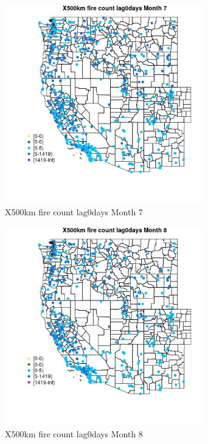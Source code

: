 \begin{figure} 
\centering  
\includegraphics[width=0.77\textwidth]{Code_Outputs/Report_ML_input_PM25_Step4_part_e_de_duplicated_aves_compiled_2019-05-14wNAs_MapObsMo7X500km_fire_count_lag0days.jpg} 
\caption{\label{fig:Report_ML_input_PM25_Step4_part_e_de_duplicated_aves_compiled_2019-05-14wNAsMapObsMo7X500km_fire_count_lag0days}X500km fire count lag0days Month 7} 
\end{figure} 
 

\begin{figure} 
\centering  
\includegraphics[width=0.77\textwidth]{Code_Outputs/Report_ML_input_PM25_Step4_part_e_de_duplicated_aves_compiled_2019-05-14wNAs_MapObsMo8X500km_fire_count_lag0days.jpg} 
\caption{\label{fig:Report_ML_input_PM25_Step4_part_e_de_duplicated_aves_compiled_2019-05-14wNAsMapObsMo8X500km_fire_count_lag0days}X500km fire count lag0days Month 8} 
\end{figure} 
 

